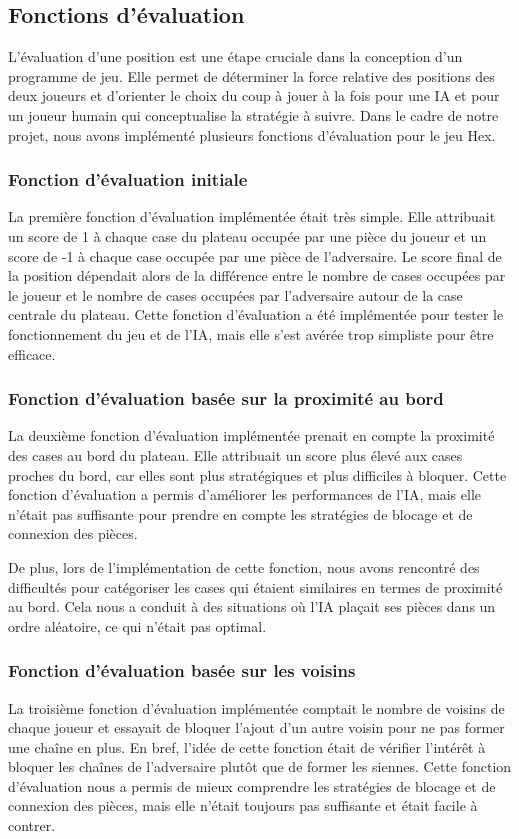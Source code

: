 \subsection{Fonctions d'évaluation}

L'évaluation d'une position est une étape cruciale dans la conception d'un programme de jeu. 
Elle permet de déterminer la force relative des positions des deux joueurs et d'orienter le choix du coup à jouer à la fois
pour une IA et pour un joueur humain qui conceptualise la stratégie à suivre.
Dans le cadre de notre projet, nous avons implémenté plusieurs fonctions d'évaluation pour le jeu Hex.

\subsubsection{Fonction d'évaluation initiale}
La première fonction d'évaluation implémentée était très simple. Elle attribuait un score de 1 à chaque case du plateau
occupée par une pièce du joueur et un score de -1 à chaque case occupée par une pièce de l'adversaire.
Le score final de la position dépendait alors de la différence entre le nombre de cases occupées par le joueur
et le nombre de cases occupées par l'adversaire autour de la case centrale du plateau.
Cette fonction d'évaluation a été implémentée pour tester le fonctionnement du jeu et de l'IA, mais elle s'est avérée
trop simpliste pour être efficace.

\subsubsection{Fonction d'évaluation basée sur la proximité au bord}
La deuxième fonction d'évaluation implémentée prenait en compte la proximité des cases au bord du plateau.
Elle attribuait un score plus élevé aux cases proches du bord, car elles sont plus stratégiques et plus difficiles à bloquer.
Cette fonction d'évaluation a permis d'améliorer les performances de l'IA, mais elle n'était pas suffisante pour
prendre en compte les stratégies de blocage et de connexion des pièces.

De plus, lors de l'implémentation de cette fonction, nous avons rencontré des difficultés pour catégoriser les cases
qui étaient similaires en termes de proximité au bord. Cela nous a conduit à des situations où l'IA plaçait ses pièces
dans un ordre aléatoire, ce qui n'était pas optimal.

\subsubsection{Fonction d'évaluation basée sur les voisins}
La troisième fonction d'évaluation implémentée comptait le nombre de voisins de chaque joueur et essayait de bloquer
l'ajout d'un autre voisin pour ne pas former une chaîne en plus. En bref, l'idée de cette fonction était de vérifier
l'intérêt à bloquer les chaînes de l'adversaire plutôt que de former les siennes.
Cette fonction d'évaluation nous a permis de mieux comprendre les stratégies de blocage et de connexion des pièces,
mais elle n'était toujours pas suffisante et était facile à contrer.


